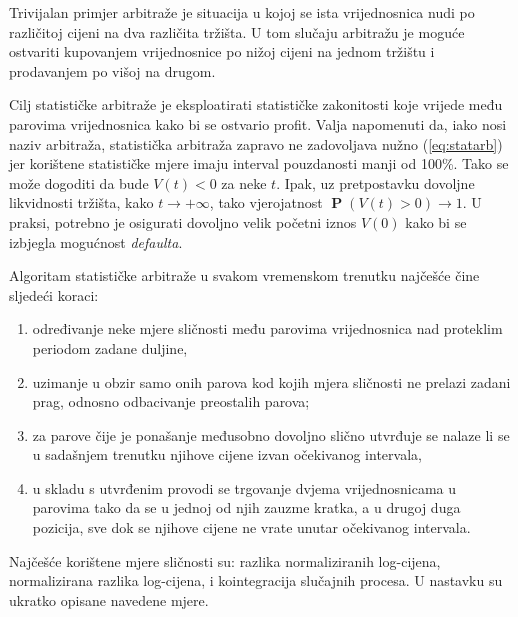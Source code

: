 \documentclass[lmodern, utf8, diplomski, numeric]{fer}
\newcommand{\prob}[1]{\operatorname{\mathbf{P}}\q(#1\w)}
\newcommand{\q}{\left}
\newcommand{\w}{\right}
\begin{document}
  Trivijalan primjer arbitraže je situacija u kojoj se ista vrijednosnica nudi po različitoj cijeni na dva različita tržišta. U tom slučaju arbitražu je moguće ostvariti kupovanjem vrijednosnice po nižoj cijeni na jednom tržištu i prodavanjem po višoj na drugom.
  
  Cilj statističke arbitraže je eksploatirati statističke zakonitosti koje vrijede među parovima vrijednosnica kako bi se ostvario profit.  
  Valja napomenuti da, iako nosi naziv arbitraža, statistička arbitraža zapravo ne zadovoljava nužno (\ref{eq:statarb}) jer korištene statističke mjere imaju  interval pouzdanosti manji od 100\%.
  Tako se može dogoditi da bude $V\q(t\w) < 0$ za neke $t$.
  Ipak, uz pretpostavku dovoljne likvidnosti tržišta, kako $t \to +\infty$, tako vjerojatnost $\prob{V\q(t\w) > 0} \to 1$.
  U praksi, potrebno je osigurati dovoljno velik početni iznos $V(0)$ kako bi se izbjegla mogućnost \textit{defaulta}.
  
  Algoritam statističke arbitraže u svakom vremenskom trenutku najčešće čine sljedeći koraci:
  \begin{enumerate}
    \item određivanje neke mjere sličnosti među parovima vrijednosnica nad proteklim periodom zadane duljine,
    \item uzimanje u obzir samo onih parova kod kojih mjera sličnosti ne prelazi zadani prag, odnosno odbacivanje preostalih parova;
    \item za parove čije je ponašanje međusobno dovoljno slično utvrđuje se nalaze li se u sadašnjem trenutku njihove cijene izvan očekivanog intervala,
    \item u skladu s utvrđenim provodi se trgovanje dvjema vrijednosnicama u parovima tako da se u jednoj od njih zauzme kratka, a u drugoj duga pozicija, sve dok se njihove cijene ne vrate unutar očekivanog intervala.
  \end{enumerate}
  
  Najčešće korištene mjere sličnosti su: razlika normaliziranih log-cijena, normalizirana razlika log-cijena, i kointegracija slučajnih procesa.
  U nastavku su ukratko opisane navedene mjere.
  
\end{document}
